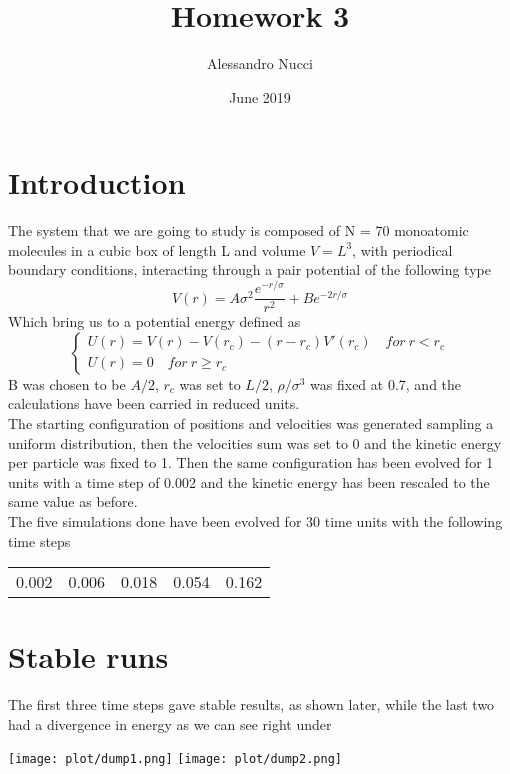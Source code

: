 \documentclass{article}
\title{Homework 3}
\author{Alessandro Nucci}
\date{June 2019}
\begin{document}
\maketitle

\section{Introduction}
The system that we are going to study is composed of N = 70 monoatomic
molecules in a cubic box of length L and volume $V = L^3$, with periodical
boundary conditions, interacting through a pair potential of the
following type
\begin{equation}
	V(r) = A\sigma^2\frac{e^{−r/\sigma}}{r^2}+ Be^{−2r/\sigma}
\end{equation}
Which bring us to a potential energy defined as
$$\begin{cases}
	U(r) = V(r) − V(r_c) − (r − r_c)V'(r_c) \quad for \: r < r_c\\
	U(r) = 0 \quad for \: r \geq r_c
\end{cases}$$
B was chosen to be $A/2$, $r_c$ was set to $L/2$, $\rho/\sigma^3$ was
fixed at 0.7, and the calculations have been carried in reduced units.\\
The starting configuration of positions and velocities was generated
sampling a uniform distribution, then the velocities sum was set to 0
and the kinetic energy per particle was fixed to 1. Then the same
configuration has been evolved for 1 units with a time step of 0.002
and the kinetic energy has been rescaled to the same value as before.\\
The five simulations done have been evolved for 30 time units with the
following time steps
\begin{center}
\begin{tabular}{c|c|c|c|c}
	0.002 & 0.006 & 0.018 & 0.054 & 0.162
\end{tabular}
\end{center}

\section{Stable runs}
The first three time steps gave stable results, as shown later, while
the last two had a divergence in energy as we can see right under
\begin{center}
	\texttt{[image: plot/dump1.png]}
	\texttt{[image: plot/dump2.png]}
\end{center}
\end{document}
